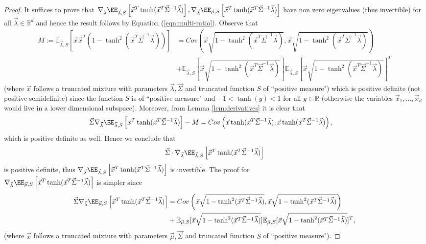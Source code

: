 \begin{proof}
	
	It suffices to prove that $	\nabla_{\vec{\lambda}} \EE_{\vec{\lambda},S}\left[\vec{x}^T\tanh(\vec{x}^T\vec{\Sigma}^{-1}\vec{\lambda})\right], 	\nabla_{\vec{\lambda}} \EE_{\vec{\mu},S}\left[\vec{x}^T\tanh(\vec{x}^T\vec{\Sigma}^{-1}\vec{\lambda})\right]$ have non zero eigenvalues (thus invertible) for all $\vec{\lambda} \in \mathbb{R}^d$ and hence the result follows by Equation (\ref{eqn:multi-ratio}).
	Observe that
	\begin{align*}
		M:= \mathbb{E}_{\vec{\lambda},S}[\vec{x}\vec{x}^T(1-\tanh^2(\vec{x}^T \vec{\Sigma}^{-1}\vec{\lambda}))] &= Cov\left(\vec{x}\sqrt{1-\tanh^2(\vec{x}^T \vec{\Sigma}^{-1}\vec{\lambda})}, \vec{x}\sqrt{1 -\tanh^2(\vec{x}^T \vec{\Sigma}^{-1}\vec{\lambda})}\right) \\&+ \mathbb{E}_{\vec{\lambda},S}[\vec{x}\sqrt{1-\tanh^2(\vec{x}^T \vec{\Sigma}^{-1}\vec{\lambda})}]\mathbb{E}_{\vec{\lambda},S}[\vec{x}\sqrt{1-\tanh^2(\vec{x}^T \vec{\Sigma}^{-1}\vec{\lambda})}]^T
	\end{align*}
	(where $\vec{x}$ follows a truncated mixture with parameters $\vec{\lambda}, \vec{\Sigma}$ and truncated function $S$ of ``positive measure") which is positive definite (not positive semidefinite) since the function $S$ is of ``positive measure" and $-1<\tanh(y)< 1$ for all $y \in \mathbb{R}$ (otherwise the variables $\vec{x}_1,...,\vec{x}_d$ would live in a lower dimensional subspace). Moreover, from Lemma \ref{lem:derivatives} it is clear that
	\begin{align*}
		\vec{\Sigma} \nabla_{\vec{\lambda}} \EE_{\vec{\lambda},S}\left[\vec{x}^T\tanh(\vec{x}^T\vec{\Sigma}^{-1}\vec{\lambda})\right] - M &= Cov\left(\vec{x}\tanh(\vec{x}^T \vec{\Sigma}^{-1}\vec{\lambda}), \vec{x}\tanh(\vec{x}^T \vec{\Sigma}^{-1}\vec{\lambda})\right),
	\end{align*}
	which is positive definite as well. Hence we conclude that $$\vec{\Sigma} \cdot \nabla_{\vec{\lambda}} \EE_{\vec{\lambda},S}\left[\vec{x}^T\tanh(\vec{x}^T\vec{\Sigma}^{-1}\vec{\lambda})\right]$$ is positive definite, thus
	$\nabla_{\vec{\lambda}}\EE_{\vec{\lambda},S}\left[\vec{x}^T\tanh(\vec{x}^T\vec{\Sigma}^{-1}\vec{\lambda})\right]$ is invertible.
	The proof for \\$\nabla_{\vec{\lambda}} \EE_{\vec{\mu},S}\left[\vec{x}^T\tanh(\vec{x}^T\vec{\Sigma}^{-1}\vec{\lambda})\right]$ is simpler since
	\begin{align*}
		\vec{\Sigma} \nabla_{\vec{\lambda}} \EE_{\vec{\mu},S}\left[\vec{x}^T\tanh(\vec{x}^T\vec{\Sigma}^{-1}\vec{\lambda})\right] &= Cov\left(\vec{x}\sqrt{1-\tanh^2(\vec{x}^T \vec{\Sigma}^{-1}\vec{\lambda})}, \vec{x}\sqrt{1 -\tanh^2(\vec{x}^T \vec{\Sigma}^{-1}\vec{\lambda})}\right)
		\\&+\mathbb{E}_{\vec{\mu},S}[\vec{x}\sqrt{1-\tanh^2(\vec{x}^T \vec{\Sigma}^{-1}\vec{\lambda})}]\mathbb{E}_{\vec{\mu},S}[\vec{x}\sqrt{1-\tanh^2(\vec{x}^T \vec{\Sigma}^{-1}\vec{\lambda})}]^T,
	\end{align*}
	(where $\vec{x}$ follows a truncated mixture with parameters $\vec{\mu}, \vec{\Sigma}$ and truncated function $S$ of ``positive measure").
	
\end{proof}	

